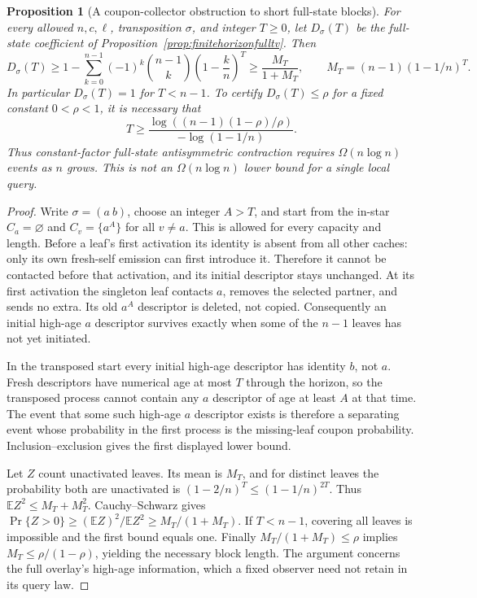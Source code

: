 \documentclass[11pt]{article}
\newtheorem{proposition}[theorem]{Proposition}
\begin{document}
\begin{proposition}[A coupon-collector obstruction to short full-state blocks]
\label{prop:antisymmetriccouponlower}
For every allowed $n,c,\ell$, transposition $\sigma$, and
integer $T\ge0$, let $D_\sigma(T)$ be the full-state
coefficient of Proposition~\ref{prop:finitehorizonfulltv}.
Then
\[
 D_\sigma(T)\ge
 1-\sum_{k=0}^{n-1}(-1)^k\binom{n-1}{k}
                    \left(1-\frac{k}{n}\right)^T
 \ge \frac{M_T}{1+M_T},
 \qquad M_T=(n-1)(1-1/n)^T.
\]
In particular $D_\sigma(T)=1$ for $T<n-1$. To certify
$D_\sigma(T)\le\rho$ for a fixed constant $0<\rho<1$,
it is necessary that
\[
 T\ge
 \frac{\log((n-1)(1-\rho)/\rho)}{-\log(1-1/n)}.
\]
Thus constant-factor full-state antisymmetric contraction
requires $\Omega(n\log n)$ events as $n$ grows. This is
not an $\Omega(n\log n)$ lower bound for a single local query.
\end{proposition}
\begin{proof}
Write $\sigma=(a\ b)$, choose an integer $A>T$, and start
from the in-star $C_a=\varnothing$ and $C_v=\{a^A\}$ for
all $v\ne a$. This is allowed for every capacity and length.
Before a leaf's first activation its identity is absent from
all other caches: only its own fresh-self emission can first
introduce it. Therefore it cannot be contacted before that
activation, and its initial descriptor stays unchanged.
At its first activation the singleton leaf contacts $a$,
removes the selected partner, and sends no extra. Its old
$a^A$ descriptor is deleted, not copied. Consequently an
initial high-age $a$ descriptor survives exactly when some
of the $n-1$ leaves has not yet initiated.

In the transposed start every initial high-age descriptor
has identity $b$, not $a$. Fresh descriptors have numerical
age at most $T$ through the horizon, so the transposed process
cannot contain any $a$ descriptor of age at least $A$ at
that time. The event that some such high-age $a$ descriptor
exists is therefore a separating event whose probability
in the first process is the missing-leaf coupon probability.
Inclusion--exclusion gives the first displayed lower bound.

Let $Z$ count unactivated leaves. Its mean is $M_T$, and
for distinct leaves the probability both are unactivated is
$(1-2/n)^T\le(1-1/n)^{2T}$. Thus
$\mathbb E Z^2\le M_T+M_T^2$. Cauchy--Schwarz gives
$\Pr\{Z>0\}\ge(\mathbb E Z)^2/\mathbb E Z^2
\ge M_T/(1+M_T)$. If $T<n-1$, covering all leaves is
impossible and the first bound equals one. Finally
$M_T/(1+M_T)\le\rho$ implies
$M_T\le\rho/(1-\rho)$, yielding the necessary block length.
The argument concerns the full overlay's high-age information,
which a fixed observer need not retain in its query law.
\end{proof}
\end{document}
